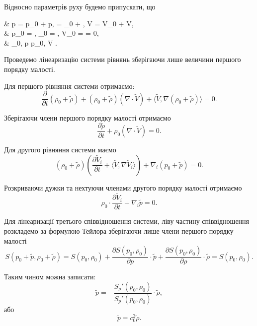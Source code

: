 Відносно параметрів руху будемо припускати, що
\begin{system}
	& p = p_0 + \tilde p, \quad \rho = \rho_0 + \tilde \rho, \quad V = V_0 + \tilde V, \\
	& p_0 = \const, \quad \rho_0 = \const, \quad V_0 = \const = 0, \\
	& \tilde \rho \ll \rho_0, \quad \tilde p \ll p_0, \quad \tilde V .
\end{system}

Проведемо лінеаризацію системи рівнянь зберігаючи лише величини першого порядку малості. \medskip

Для першого рівняння системи отримаємо:
\begin{equation}
	\frac{\partial}{\partial t} (\rho_0 + \tilde \rho) + (\rho_0 + \tilde \rho) (\nabla \cdot \tilde V) + \langle \tilde V, \nabla (\rho_0 + \tilde \rho) \rangle = 0.
\end{equation}

Зберігаючи члени першого порядку малості отримаємо
\begin{equation}
	\frac{\partial \tilde \rho}{\partial t} + \rho_0 (\nabla \cdot \tilde V) = 0.
\end{equation}

Для другого рівняння системи маємо
\begin{equation}
	(\rho_0 + \tilde \rho) \left( \frac{\partial \tilde V_i}{\partial t} + \langle \tilde V, \nabla \tilde V_i \rangle \right) + \nabla_i (p_0 + \tilde p) = 0.
\end{equation}

Розкриваючи дужки та нехтуючи членами другого порядку малості отримаємо
\begin{equation}
	\rho_0 \cdot \frac{\partial \tilde V_i}{\partial t} + \nabla_i \tilde p = 0.
\end{equation}

Для лінеаризації третього співвідношення системи, ліву частину співвідношення розкладемо за формулою Тейлора зберігаючи лише члени першого порядку малості
\begin{equation}
	S(p_0 + \tilde p, \rho_0 + \tilde \rho) = S(p_0, \rho_0) + \frac{\partial S(p_0, \rho_0)}{\partial p} \cdot \tilde p + \frac{\partial S(p_0, \rho_0)}{\partial \rho} \cdot \tilde \rho = S(p_0, \rho_0).
\end{equation}

Таким чином можна записати:
\begin{equation}
	\tilde p = - \frac{S_\rho' (p_0, \rho_0)}{S_p'(p_0, \rho_0)} \cdot \tilde \rho,
\end{equation}
або
\begin{equation}
	\tilde p = c_0^2 \tilde \rho.
\end{equation}

